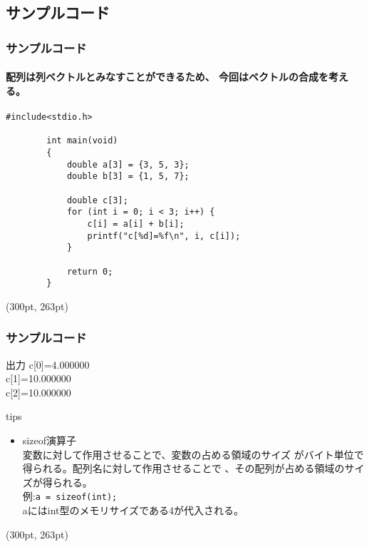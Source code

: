 \documentclass[dvipdfmx]{beamer}
\begin{document}
\subsection{サンプルコード}
\begin{frame}[t, fragile]
    \frametitle{サンプルコード}
    \framesubtitle{配列は列ベクトルとみなすことができるため、
    今回はベクトルの合成を考える。}
    \begin{lstlisting}[gobble=8, caption=pra\_array.c]
        #include<stdio.h>

        int main(void) 
        {
            double a[3] = {3, 5, 3};
            double b[3] = {1, 5, 7};

            double c[3];
            for (int i = 0; i < 3; i++) {
                c[i] = a[i] + b[i];
                printf("c[%d]=%f\n", i, c[i]);
            }
            
            return 0;
        }
    \end{lstlisting}
    \begin{textblock*}{0.3\linewidth}(300pt, 263pt)
        \space
    \end{textblock*}
\end{frame}

\begin{frame}[c, fragile]
    \frametitle{サンプルコード}
    \begin{block}{出力}
        c[0]=4.000000\\
        c[1]=10.000000\\
        c[2]=10.000000\\
    \end{block}
    \begin{itembox}[l]{tips}
        \begin{itemize}
            \item sizeof演算子\\
                 変数に対して作用させることで、変数の占める領域のサイズ
                 がバイト単位で得られる。配列名に対して作用させることで
                 、その配列が占める領域のサイズが得られる。\\
                 例:\space \texttt{a = sizeof(int);}\\
                 aにはint型のメモリサイズである4が代入される。
        \end{itemize}
    \end{itembox}
    \begin{textblock*}{0.3\linewidth}(300pt, 263pt)
        \space
    \end{textblock*}
\end{frame}
\end{document}
